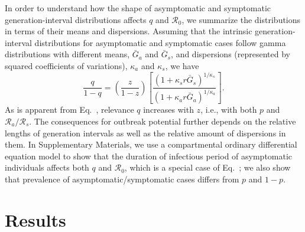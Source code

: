 In order to understand how the shape of asymptomatic and symptomatic generation-interval distributions affects $q$ and $\mathcal R_0$, we summarize the distributions in terms of their means and dispersions.
Assuming that the intrinsic generation-interval distributions for asymptomatic and symptomatic cases follow gamma distributions \citep{park_2019practical} with different means, $\bar G_a$ and $\bar G_s$, and dispersions (represented by squared coefficients of variations), $\kappa_a$ and $\kappa_s$, 
we have
\begin{equation}
\frac{q}{1-q}=\left(\frac{z}{1-z}\right)\left[\frac{(1 + \kappa_s r \bar G_s)^{1/\kappa_s}}{(1 + \kappa_a r \bar G_a)^{1/\kappa_a}}\right].
\label{eq.gammaratio}
\end{equation}
As is apparent from Eq.~, relevance $q$ increases with $z$, i.e., with both $p$ and $\mathcal R_a/\mathcal R_s$. The consequences for outbreak potential further depends on the relative lengths of generation intervals as well as the relative amount of dispersions in them.
In Supplementary Materials, we use a compartmental ordinary differential equation model to show that the duration of infectious period of asymptomatic individuals affects both $q$ and $\mathcal R_0$, which is a special case of Eq.~; we also show that prevalence of asymptomatic/symptomatic cases differs from $p$ and $1-p$.

\section{Results}

